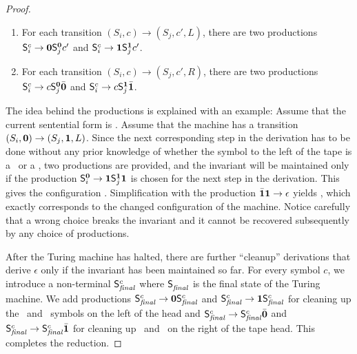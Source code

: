 \documentclass[9pt]{sigplanconf}
\begin{document}
\begin{proof}
\begin{enumerate}
\item For each transition  $(S_i, c) \rightarrow (S_j,c',L)$, there are
  two  productions $\mathsf{S}_{i}^{c}  \rightarrow  \mathbf{0} \mathsf{S}_{j}^{\mathbf{0}}c'$
  and $\mathsf{S}_{i}^{c} \rightarrow \mathbf{1} \mathsf{S}_{j}^{\mathbf{1}}c'$.
\item For each  transition $(S_i, c) \rightarrow (S_j,c',R)$, there
  are two productions
  $\mathsf{S}_{i}^{c} \rightarrow c \mathsf{S}_{j}^{\mathbf{0}}\bar{\mathbf{0}}$ and $\mathsf{S}_{i}^{c}
  \rightarrow c \mathsf{S}_{j}^{\mathbf{1}}\bar{\mathbf{1}}$. 
\end{enumerate}
The idea behind  the productions is explained with  an example: Assume
that        the        current        sentential        form        is
\bcar\bcdr{}\acar\acar.  Assume that  the  machine has  a
transition  $(S_i,\mathbf{0}) \rightarrow (S_j,\mathbf{1},  L)$. Since  the next
corresponding step in the derivation  has to be done without any prior
knowledge of whether the symbol to the left of the tape is a \acar\ or
a  \acdr, two  productions are  provided,  and the  invariant will  be
maintained  only   if  the  production   $\mathsf{S}_{i}^{\mathbf{0}}  \rightarrow
\mathbf{1}\mathsf{S}_{j}^{\mathbf{1}}\mathbf{1}$  is  chosen  for   the  next  step  in  the
derivation.         This         gives        the        configuration
\bcar\bcdr\acdr{}\acdr\acar\acar.    Simplification  with
the    production    $\bar{\mathbf{1}}\mathbf{1}    \rightarrow    \epsilon$    yields
\bcar{}\acdr\acar\acar, which  exactly corresponds to the
changed configuration  of the machine.  Notice carefully that  a wrong
choice breaks the invariant and it cannot be recovered subsequently by
any choice of productions.

After  the Turing machine  has halted,  there are  further ``cleanup''
derivations  that derive  $\epsilon$ only  if the  invariant  has been
maintained  so far.  For every  symbol  $c$, we introduce  a  non-terminal
$\mathsf{S}_{\mathit{final}}^{c}$ where $\mathsf{S}_{\mathit{final}}^{}$ is the
final state of the Turing machine. We add
productions $\mathsf{S}_{\mathit{final}}^{c} \rightarrow \mathbf{0}
\mathsf{S}_{\mathit{final}}^{c}$ and $\mathsf{S}_{\mathit{final}}^{c} \rightarrow \mathbf{1}
\mathsf{S}_{\mathit{final}}^{c}$ for cleaning up the \bcar\ and \bcdr\ symbols on
the left of the head and $\mathsf{S}_{\mathit{final}}^{c} \rightarrow 
\mathsf{S}_{\mathit{final}}^{c}\bar{\mathbf{0}}$ and $\mathsf{S}_{\mathit{final}}^{c} \rightarrow 
\mathsf{S}_{\mathit{final}}^{c}\bar{\mathbf{1}}$ for cleaning up \acar\ and \acdr\ on the
right of the tape head. This completes the reduction.
\end{proof}
\end{document}

